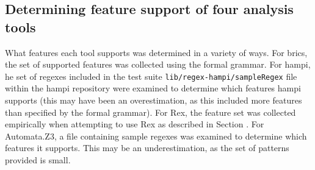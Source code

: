 \subsection*{Determining feature support of four analysis tools}
\label{app:determiningToolFeatures}
What features each tool supports was determined in a variety of ways.  For brics, the set of supported features was collected using the formal grammar.  For hampi, he set of regexes included in the test suite {\tt lib/regex-hampi/sampleRegex} file within the hampi repository were examined to determine which features hampi supports (this may have been an overestimation, as this included more features than specified by the formal grammar).  For Rex, the feature set was collected empirically when attempting to use Rex as described in Section  .  For Automata.Z3, a file containing sample regexes was examined to determine which features it supports.  This may be an underestimation, as the set of patterns provided is small.





